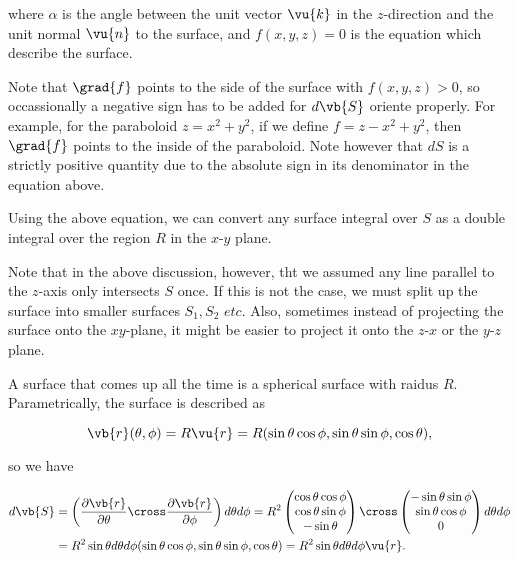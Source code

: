 \documentclass[english,a4paper,12pt]{report}
\begin{document}
where \(\alpha \) is the angle between the unit vector \(\vu{k} \) in the \(z\)-direction and the unit normal \(\vu{n} \) to the surface, and \(f(x,y,z)=0\) is the equation which describe the surface.

Note that \(\grad{f} \) points to the side of the surface with \(f(x,y,z) > 0\), so occassionally a negative sign has to be added for \(d\vb{S} \) oriente properly. For example, for the paraboloid \(z = x^2+y^2\), if we define \(f = z-x^2+y^2\), then \(\grad{f} \) points to the inside of the paraboloid. Note however that \(dS\) is a strictly positive quantity due to the absolute sign in its denominator in the equation above.      


Using the above equation, we can convert any surface integral over \(S\) as a double integral over the region \(R\) in the \(x\)-\(y\) plane.

Note that in the above discussion, however, tht we assumed any line parallel to the \(z\)-axis only intersects \(S\) once. If this is not the case, we must split up the surface into smaller surfaces \(S_1, S_2 \textit{ etc.}\) Also, sometimes instead of projecting the surface onto the \(xy\)-plane, it might be easier to project it onto the \(z\)-\(x\) or the \(y\)-\(z\) plane.     

A surface that comes up all the time is a spherical surface with raidus \(R\). Parametrically, the surface is described as 

\begin{equation}
	\vb{r} (\theta ,\phi ) = R \vu{r} = R(\sin \theta \cos \phi , \sin \theta \sin \phi , \cos \theta ),
\end{equation}

so we have  

\begin{equation}
	\begin{aligned} 
	d\vb{S} &= \left( \frac{\partial \vb{r} }{\partial \theta }  \cross \frac{\partial \vb{r} }{\partial \phi }   \right) d \theta d\phi = R^2 \begin{pmatrix}
		 \cos \theta \cos \phi  \\
		 \cos \theta \sin \phi  \\
		 -\sin \theta  \\
	\end{pmatrix} \cross \begin{pmatrix}
		 -\sin \theta \sin \phi  \\
		 \sin \theta \cos \phi  \\
		 0 \\
	\end{pmatrix} d \theta d \phi \\
	&= R^2 \sin \theta d \theta d\phi  (\sin \theta \cos \phi , \sin \theta \sin \phi , \cos \theta ) = R^2\sin \theta d \theta d\phi \vu{r} .
	\end{aligned} 
\end{equation}
\end{document}
